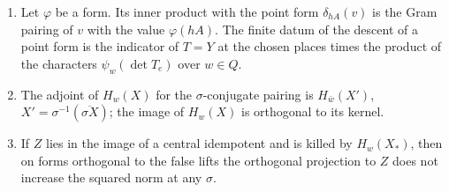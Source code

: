 \begin{proposition}\label{prop:point-forms}
\begin{enumerate}[label=\textup{(\alph*)}]
\item Let $\varphi$ be a form. Its inner product with the point form $\delta_{hA}(v)$ is the Gram pairing of $v$ with the value $\varphi(hA)$. The finite datum of the descent of a point form is the indicator of $T=Y$ at the
chosen places times the product of the characters $\psi_w(\det T_e)$ over $w\in Q$.
\item The adjoint of $H_w(X)$ for the $\sigma$-conjugate pairing is $H_{\bar w}(X')$, $X'=\sigma^{-1}(\overline{\sigma X})$; the image of $H_w(X)$ is orthogonal to its kernel.
\item If $Z$ lies in the image of a central idempotent and is killed by $H_w(X_*)$, then on forms orthogonal to the false lifts the orthogonal projection to $Z$ does not increase the squared norm at any $\sigma$.
\end{enumerate}
\end{proposition}

